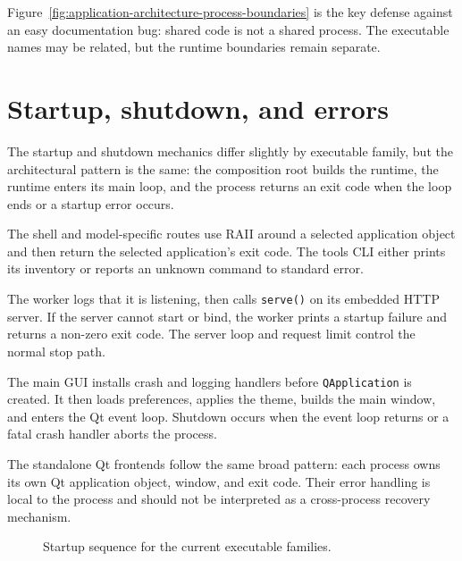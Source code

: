 Figure~\ref{fig:application-architecture-process-boundaries} is the key
defense against an easy documentation bug: shared code is not a shared process.
The executable names may be related, but the runtime boundaries remain separate.

\section{Startup, shutdown, and errors}
\label{sec:application-architecture-runtime-flow}

The startup and shutdown mechanics differ slightly by executable family, but
the architectural pattern is the same: the composition root builds the runtime,
the runtime enters its main loop, and the process returns an exit code when the
loop ends or a startup error occurs.

The shell and model-specific routes use RAII around a selected application
object and then return the selected application's exit code. The tools CLI
either prints its inventory or reports an unknown command to standard error.

The worker logs that it is listening, then calls \texttt{serve()} on its
embedded HTTP server. If the server cannot start or bind, the worker prints a
startup failure and returns a non-zero exit code. The server loop and request
limit control the normal stop path.

The main GUI installs crash and logging handlers before \texttt{QApplication}
is created. It then loads preferences, applies the theme, builds the main
window, and enters the Qt event loop. Shutdown occurs when the event loop
returns or a fatal crash handler aborts the process.

The standalone Qt frontends follow the same broad pattern: each process owns
its own Qt application object, window, and exit code. Their error handling is
local to the process and should not be interpreted as a cross-process recovery
mechanism.

\begin{figure}[htbp]
\centering
\caption{Startup sequence for the current executable families.}
\label{fig:application-architecture-startup-sequence}
\end{figure}

